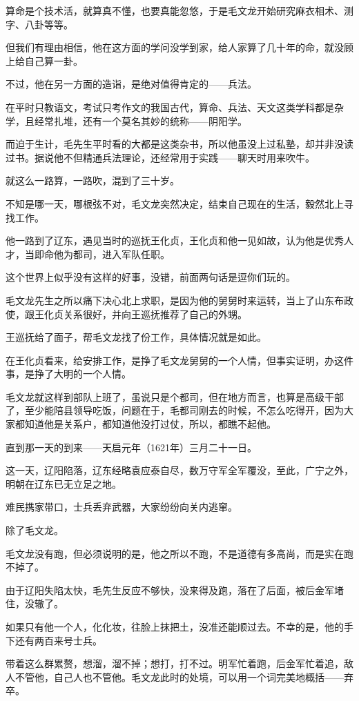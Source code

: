 \begin{multicols}{\theparacolNo}
		算命是个技术活，就算真不懂，也要真能忽悠，于是毛文龙开始研究麻衣相术、测字、八卦等等。

		但我们有理由相信，他在这方面的学问没学到家，给人家算了几十年的命，就没顾上给自己算一卦。

		不过，他在另一方面的造诣，是绝对值得肯定的——兵法。

		在平时只教语文，考试只考作文的我国古代，算命、兵法、天文这类学科都是杂学，且经常扎堆，还有一个莫名其妙的统称——阴阳学。

		而迫于生计，毛先生平时看的大都是这类杂书，所以他虽没上过私塾，却并非没读过书。据说他不但精通兵法理论，还经常用于实践——聊天时用来吹牛。

		就这么一路算，一路吹，混到了三十岁。

		不知是哪一天，哪根弦不对，毛文龙突然决定，结束自己现在的生活，毅然北上寻找工作。

		他一路到了辽东，遇见当时的巡抚王化贞，王化贞和他一见如故，认为他是优秀人才，当即命他为都司，进入军队任职。

		这个世界上似乎没有这样的好事，没错，前面两句话是逗你们玩的。

		毛文龙先生之所以痛下决心北上求职，是因为他的舅舅时来运转，当上了山东布政使，跟王化贞关系很好，并向王巡抚推荐了自己的外甥。

		王巡抚给了面子，帮毛文龙找了份工作，具体情况就是如此。

		在王化贞看来，给安排工作，是挣了毛文龙舅舅的一个人情，但事实证明，办这件事，是挣了大明的一个人情。

		毛文龙就这样到部队上班了，虽说只是个都司，但在地方而言，也算是高级干部了，至少能陪县领导吃饭，问题在于，毛都司刚去的时候，不怎么吃得开，因为大家都知道他是关系户，都知道他没打过仗，所以，都瞧不起他。

		直到那一天的到来——天启元年（1621年）三月二十一日。

		这一天，辽阳陷落，辽东经略袁应泰自尽，数万守军全军覆没，至此，广宁之外，明朝在辽东已无立足之地。

		难民携家带口，士兵丢弃武器，大家纷纷向关内逃窜。

		除了毛文龙。

		毛文龙没有跑，但必须说明的是，他之所以不跑，不是道德有多高尚，而是实在跑不掉了。

		由于辽阳失陷太快，毛先生反应不够快，没来得及跑，落在了后面，被后金军堵住，没辙了。

		如果只有他一个人，化化妆，往脸上抹把土，没准还能顺过去。不幸的是，他的手下还有两百来号士兵。

		带着这么群累赘，想溜，溜不掉；想打，打不过。明军忙着跑，后金军忙着追，敌人不管他，自己人也不管他。毛文龙此时的处境，可以用一个词完美地概括——弃卒。


\end{multicols}
